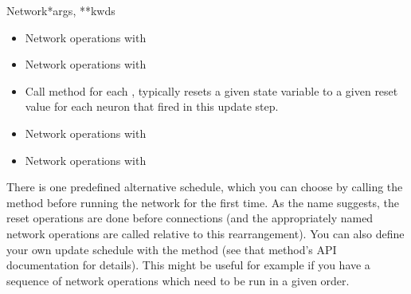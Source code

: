 \documentclass[letterpaper,10pt,english]{manual}
\begin{document}
\begin{classdesc}{Network}{*args, **kwds}
\begin{itemize}
\item {} 
Network operations with 

\item {} 
Network operations with 

\item {} 
Call  method for each \hyperlink{brian.NeuronGroup}{}, typically resets a
given state variable to a given reset value for each neuron that fired
in this update step.

\item {} 
Network operations with 

\item {} 
Network operations with 

\end{itemize}

There is one predefined alternative schedule, which you can choose by calling
the  method before running the
network for the first time. As the name suggests, the reset operations are
done before connections (and the appropriately named network operations are
called relative to this rearrangement). You can also define your own update
schedule with the  method (see that method's API documentation for
details). This might be useful for example if you have a sequence of network
operations which need to be run in a given order.
\end{classdesc}
\end{document}
